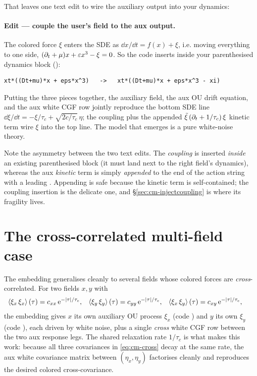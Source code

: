 That leaves one text edit to wire the auxiliary output into your dynamics:

\paragraph{Edit --- couple the user's field to the aux output.} The colored
force $\xi$ enters the SDE as $\dd x/\dd t = f(x) + \xi$, i.e. moving everything to
one side, $(\partial_t + \mu)x + \varepsilon x^3 - \xi = 0$. So the code inserts
 inside your parenthesised dynamics block
():
\begin{lstlisting}[style=console]
    xt*((Dt+mu)*x + eps*x^3)   ->   xt*((Dt+mu)*x + eps*x^3 - xi)
\end{lstlisting}

Putting the three pieces together, the auxiliary field, the aux OU drift
equation, and the aux white CGF row jointly reproduce the bottom SDE line
$\dd\xi/\dd t = -\xi/\tau_c + \sqrt{2c/\tau_c}\,\eta$; the  coupling
plus the appended $\tilde\xi\,(\partial_t + 1/\tau_c)\,\xi$ kinetic term wire $\xi$ into
the top line. The model that emerges is a pure white-noise theory.

\begin{note}
Note the asymmetry between the two text edits. The  \emph{coupling} is
inserted \emph{inside} an existing parenthesised block (it must land next to the
right field's dynamics), whereas the aux \emph{kinetic} term is simply
\emph{appended} to the end of the action string with a leading \code{+}. Appending
is safe because the kinetic term is self-contained; the coupling insertion is the
delicate one, and \S\ref{sec:cm-injectcoupling} is where its fragility lives.
\end{note}

\section{The cross-correlated multi-field case}

The embedding generalises cleanly to several fields whose colored forces are
\emph{cross}-correlated. For two fields $x, y$ with
\begin{align}
  \left\langle \xi_x\,\xi_x \right\rangle(\tau) &= c_{xx}\,\mathrm{e}^{-|\tau|/\tau_c}, &
  \left\langle \xi_y\,\xi_y \right\rangle(\tau) &= c_{yy}\,\mathrm{e}^{-|\tau|/\tau_c}, &
  \left\langle \xi_x\,\xi_y \right\rangle(\tau) &= c_{xy}\,\mathrm{e}^{-|\tau|/\tau_c},
  \label{eq:cm-cross}
\end{align}
the embedding gives $x$ its own auxiliary OU process $\xi_x$ (code ) and
$y$ its own $\xi_y$ (code ), each driven by white noise, plus a single
\emph{cross} white CGF row between the two aux response legs. The shared
relaxation rate $1/\tau_c$ is what makes this work: because all three covariances
in \eqref{eq:cm-cross} decay at the same rate, the aux white covariance matrix
between $(\eta_x, \eta_y)$ factorises cleanly and reproduces the desired colored
cross-covariance.

